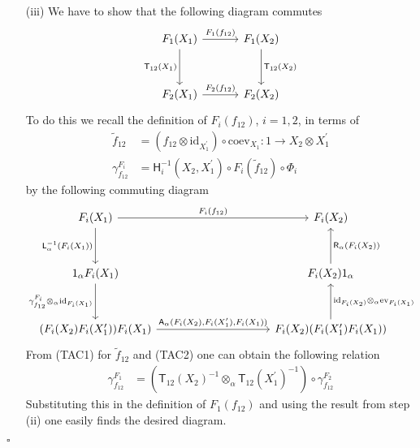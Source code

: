 \begin{prf}[Sketch]
\begin{enumerate}
\item[(iii)]
We have to show that the following diagram commutes
\begin{equation*}
\begin{tikzcd}[row sep=3.2em,column sep=3.2em]
  F_{1}(X_{1})
  \ar{r}{F_{1}(f_{12})}
  \ar{d}[swap]{\mathsf{T}_{12}(X_{1})}
  &
  F_{1}(X_{2})
  \ar{d}{\mathsf{T}_{12}(X_{2})}
  \\
  F_{2}(X_{1})
  \ar{r}{F_{2}(f_{12})}
  &
  F_{2}(X_{2})
\end{tikzcd}
\end{equation*}
To do this we recall the definition of $F_{i}(f_{12})$, $i = 1,2$, in terms of
\begin{align*}
  \tilde{f}_{12}
  &=
  \left(
    f_{12}
    \otimes
    \mathrm{id}_{X_{1}^{\prime}}
  \right)
  \circ
  \mathrm{coev}_{X_{1}}
  \colon
  1
  \to
  X_{2} \otimes X_{1}^{\prime}
  \\
  \gamma_{f_{12}}^{F_{i}}
  &=
  \mathsf{H}_{i}^{-1}(X_{2},X_{1}^{\prime})
  \circ
  F_{i}(\tilde{f}_{12})
  \circ
  \Phi_{i}
\end{align*}
by the following commuting diagram
\begin{equation*}
\begin{tikzcd}[row sep=3.2em,column sep=10em]
  F_{i}(X_{1})
  \ar{r}{F_{i}(f_{12})}
  \ar{d}[swap]{\mathsf{L}_{\alpha}^{-1}(F_{i}(X_{1}))}
  &
  F_{i}(X_{2})
  \\
  1_{\alpha} F_{i}(X_{1})
  \ar{d}[swap]{\gamma_{f_{12}}^{F_{i}} \otimes_{\alpha} \mathrm{id}_{F_{i}(X_{1})}}
  &
  F_{i}(X_{2}) 1_{\alpha}
  \ar{u}[swap]{\mathsf{R}_{\alpha}(F_{i}(X_{2}))}
  \\
  (F_{i}(X_{2}) F_{i}(X_{1}^{\prime})) F_{i}(X_{1})
  \ar{r}{\mathsf{A}_{\alpha}(F_{i}(X_{2}),F_{i}(X_{1}^{\prime}),F_{i}(X_{1}))}
  &
  F_{i}(X_{2}) (F_{i}(X_{1}^{\prime}) F_{i}(X_{1}))
  \ar{u}[swap]{\mathrm{id}_{F_{i}(X_{2})} \otimes_{\alpha} \mathrm{ev}_{F_{i}(X_{1})}}
\end{tikzcd}
\end{equation*}
From (TAC1) for $\tilde{f}_{12}$ and (TAC2) one can obtain the following relation
\begin{align*}
  \gamma_{f_{12}}^{F_{1}}
  &=
  \left(
    \mathsf{T}_{12}(X_{2})^{-1}
    \otimes_{\alpha}
    \mathsf{T}_{12}(X_{1}^{\prime})^{-1}
  \right)
  \circ
  \gamma_{f_{12}}^{F_{2}}
\end{align*}
Substituting this in the definition of $F_{1}(f_{12})$ and using the result from step (ii) one easily finds the desired diagram.
\end{enumerate}
\phantom{proven}
\hfill
$\square$
\end{prf}
